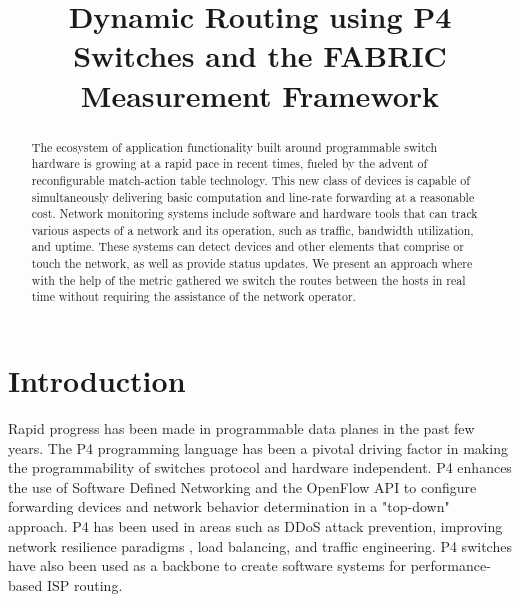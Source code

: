 \documentclass[conference]{IEEEtran}
\begin{document}
    \title{Dynamic Routing using P4 Switches and the FABRIC Measurement Framework\\}

    \author{
    \and
    }
    \maketitle

    \begin{abstract}
        The ecosystem of application functionality built around programmable
        switch hardware is growing at a rapid pace in recent times, fueled by
        the advent of reconfigurable match-action table technology.
        This new class of devices is capable of simultaneously delivering
        basic computation and line-rate forwarding at a reasonable cost.
        Network monitoring systems include software and hardware tools that can track various aspects of a network and its operation, such as traffic, bandwidth utilization, and uptime. These systems can detect devices and other elements that comprise or touch the network, as well as provide status updates. We present an approach where with the help of the metric gathered we switch the routes between the hosts in real time without requiring the assistance of the network operator.

    \end{abstract}

    \begin{IEEEkeywords}
    \end{IEEEkeywords}


    \section{Introduction}
    Rapid progress has been made in programmable data planes in the past few years. The P4 programming language \cite{b1} has been a pivotal driving factor in making the programmability of switches protocol and hardware independent. P4 enhances the use of Software Defined Networking and the OpenFlow API to configure forwarding devices and network behavior determination in a "top-down" approach. P4 has been used in areas such as DDoS attack prevention, improving network resilience paradigms \cite{b2}, load balancing, and traffic engineering. P4 switches have also been used as a backbone to create software systems for performance-based ISP routing.
\end{document}
